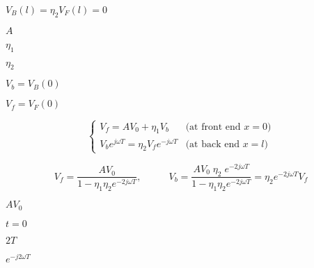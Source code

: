 {\newpage\clearpage
{}%
$V_B(l)=\eta_2 V_F(l)=0$%
\lthtmlinlinemathZ
\lthtmlcheckvsize\clearpage}

{\newpage\clearpage
{}%
$A$%
\lthtmlinlinemathZ
\lthtmlcheckvsize\clearpage}

{\newpage\clearpage
{}%
$\eta_1$%
\lthtmlinlinemathZ
\lthtmlcheckvsize\clearpage}

{\newpage\clearpage
{}%
$\eta_2$%
\lthtmlinlinemathZ
\lthtmlcheckvsize\clearpage}

{\newpage\clearpage
{}%
$V_b=V_B(0)$%
\lthtmlinlinemathZ
\lthtmlcheckvsize\clearpage}

{\newpage\clearpage
{}%
$V_f=V_F(0)$%
\lthtmlinlinemathZ
\lthtmlcheckvsize\clearpage}

{\newpage\clearpage
{}%
\begin{displaymath} \left\{ \begin{array}{ll}
V_f=AV_0+\eta_1V_b & \mbox{(at front end $x=0$)} \\
V_be^{j\omega T}=\eta_2V_fe^{-j\omega T} & \mbox{(at back end $x=l$)}
	\end{array} \right. \end{displaymath}%
\lthtmldisplayZ
\lthtmlcheckvsize\clearpage}

{\newpage\clearpage
{}%
\begin{displaymath} V_f=\frac{AV_0}{1-\eta_1\eta_2e^{-2j\omega T}},\;\;\;\;\;\;\;\;\;\;
   V_b=\frac{AV_0\;\eta_2\;e^{-2j\omega T}}{1-\eta_1\eta_2e^{-2j\omega T}}
   =\eta_2e^{-2j\omega T} V_f
\end{displaymath}%
\lthtmldisplayZ
\lthtmlcheckvsize\clearpage}

{\newpage\clearpage
{}%
$AV_0$%
\lthtmlinlinemathZ
\lthtmlcheckvsize\clearpage}

{\newpage\clearpage
{}%
$t=0$%
\lthtmlinlinemathZ
\lthtmlcheckvsize\clearpage}

{\newpage\clearpage
{}%
$2T$%
\lthtmlinlinemathZ
\lthtmlcheckvsize\clearpage}

{\newpage\clearpage
{}%
$e^{-j2\omega T}$%
\lthtmlinlinemathZ
\lthtmlcheckvsize\clearpage}

